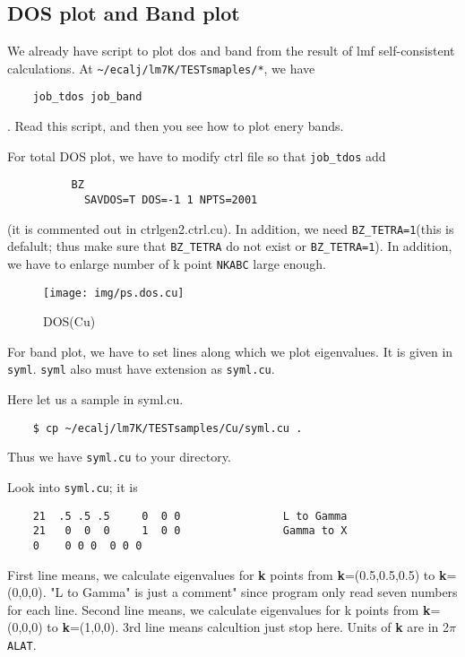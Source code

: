 \documentclass[a4paper,10pt,epsf,fleqn]{article}
\begin{document}
\subsection{DOS plot and Band plot}

We already have script to plot dos and band from the result of lmf
self-consistent calculations.
At \verb+~/ecalj/lm7K/TESTsmaples/*+, we have
\begin{verbatim}
    job_tdos job_band
\end{verbatim}
. Read this script, and then you see how to plot enery bands.


For total DOS plot, we have to modify ctrl file so that
\verb+job_tdos+ add
\begin{verbatim}
          BZ
            SAVDOS=T DOS=-1 1 NPTS=2001
\end{verbatim}
(it is commented out in ctrlgen2.ctrl.cu). 
In addition, we need
\verb+BZ_TETRA=1+(this is defalult; thus make sure that \verb+BZ_TETRA+ do
not exist or \verb+BZ_TETRA=1+). 
In addition, we have to enlarge number of k point \verb+NKABC+
large enough.


\begin{figure}[h]
 \begin{center}
  \texttt{[image: img/ps.dos.cu]}
  \vspace{5mm}
  \caption{DOS(Cu)}
 \end{center}
\end{figure}
 

For band plot, we have to set lines along which we plot eigenvalues.
It is given in \verb+syml+. \verb+syml+ also must have extension
as \verb+syml.cu+.

Here let us a sample in syml.cu.
\begin{verbatim}
    $ cp ~/ecalj/lm7K/TESTsamples/Cu/syml.cu .
\end{verbatim}
Thus we have \verb+syml.cu+ to your directory.

Look into \verb+syml.cu+; it is
\begin{verbatim}
    21  .5 .5 .5     0  0 0                L to Gamma
    21   0  0  0     1  0 0                Gamma to X
    0    0 0 0  0 0 0
\end{verbatim}
First line means, we calculate eigenvalues 
for {\bf k} points from {\bf k}=(0.5,0.5,0.5) to {\bf k}=(0,0,0).
"L to Gamma" is just a comment" since program only read seven numbers
for each line.
Second line means, we calculate eigenvalues 
for k points from {\bf k}=(0,0,0) to {\bf k}=(1,0,0).
3rd line means calcultion just stop here.
Units of {\bf k} are in 2$\pi$\verb+ALAT+.
\end{document}
